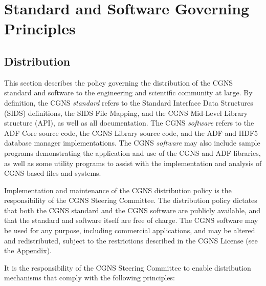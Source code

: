 \section{Standard and Software Governing Principles}
\label{s:principles}
\thispagestyle{plain}

\subsection{Distribution}
\label{s:distribution}

This section describes the policy governing the distribution of the
CGNS standard and software to the engineering and scientific community
at large.
By definition, the CGNS \textit{standard} refers to the
Standard Interface Data Structures
(SIDS) definitions, the SIDS File Mapping, and the CGNS Mid-Level
Library structure (API), as well as all documentation.
The CGNS \textit{software} refers to the ADF Core source code, the CGNS
Library source code, and the ADF and HDF5 database manager implementations.
The CGNS \textit{software} may also include sample programs
demonstrating the application and use of the CGNS and ADF libraries,
as well as some utility programs to assist with the implementation and
analysis of CGNS-based files and systems.

Implementation and maintenance of the CGNS distribution policy is the
responsibility of the CGNS Steering Committee.
The distribution policy dictates that both the CGNS standard and the
CGNS software are publicly available, and that the standard and software
itself are free of charge.
The CGNS software may be used for any purpose, including commercial
applications, and may be altered and redistributed, subject to the
restrictions described in the CGNS License (see the
\hyperref[s:license]{Appendix}).

It is the responsibility of the CGNS Steering Committee to enable
distribution mechanisms that comply with the following principles:

